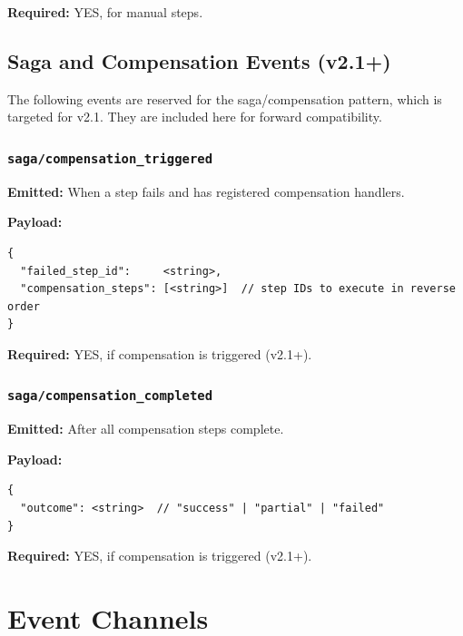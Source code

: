 \textbf{Required:} YES, for manual steps.


\subsection{Saga and Compensation Events (v2.1+)}

The following events are reserved for the saga/compensation pattern, which is targeted for v2.1. They are included here for forward compatibility.

\subsubsection{\texttt{saga/compensation\_triggered}}

\textbf{Emitted:} When a step fails and has registered compensation handlers.

\textbf{Payload:}
\begin{verbatim}
{
  "failed_step_id":     <string>,
  "compensation_steps": [<string>]  // step IDs to execute in reverse order
}
\end{verbatim}

\textbf{Required:} YES, if compensation is triggered (v2.1+).


\subsubsection{\texttt{saga/compensation\_completed}}

\textbf{Emitted:} After all compensation steps complete.

\textbf{Payload:}
\begin{verbatim}
{
  "outcome": <string>  // "success" | "partial" | "failed"
}
\end{verbatim}

\textbf{Required:} YES, if compensation is triggered (v2.1+).

\section{Event Channels}

